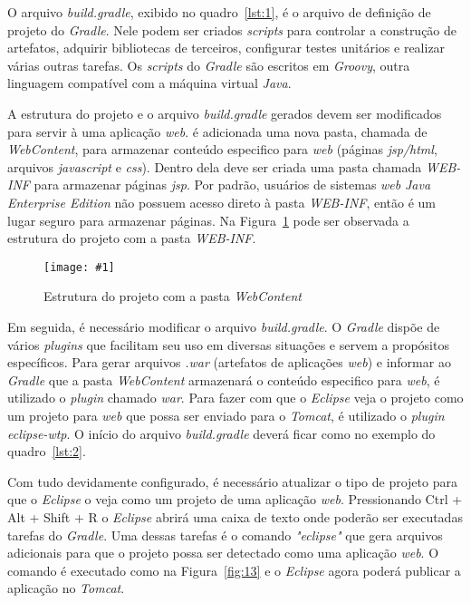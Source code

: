 \documentclass[a4paper,12pt]{article}
\newcommand{\figura}[3] {
	\begin{figure}[ht]
		\centering
		\texttt{[image: \#1]}
		\caption{#2}
		\label{#3}
	\end{figure}
	\FloatBarrier
}
\newcommand{\est}[1] {
\textit{#1}}
\newcommand{\arquivo}[1] {
\textit{#1}}
\newcommand{\lang}[1] {
\textit{#1}}
\newcommand{\groovycode}[3] {
	
}
\begin{document}
O arquivo \arquivo{build.gradle}, exibido no quadro~\ref{lst:1}, é o arquivo de definição de projeto do \est{Gradle}. Nele podem ser criados \est{scripts} para controlar a construção de artefatos, adquirir bibliotecas de terceiros, configurar testes unitários e realizar várias outras tarefas. Os \est{scripts} do \est{Gradle} são escritos em \lang{Groovy}, outra linguagem compatível com a máquina virtual \lang{Java}. 

\groovycode{code/buildgradle.txt}{O arquivo \est{build.gradle}}{lst:1}

A estrutura do projeto e o arquivo \arquivo{build.gradle} gerados devem ser modificados para servir à uma aplicação \est{web}. é adicionada uma nova pasta, chamada de \est{WebContent}, para armazenar conteúdo especifico para \est{web} (páginas \est{jsp/html}, arquivos \lang{javascript} e \lang{css}). Dentro dela deve ser criada uma pasta chamada \est{WEB-INF} para armazenar páginas \est{jsp}. Por padrão, usuários de sistemas \est{web} \est{Java Enterprise Edition} não possuem acesso direto à pasta \est{WEB-INF}, então é um lugar seguro para armazenar páginas. Na Figura~\ref{fig:12} pode ser observada a estrutura do projeto com a pasta \est{WEB-INF}.

\figura{prrojetocomweninf.png}{Estrutura do projeto com a pasta \est{WebContent}}{fig:12}

Em seguida, é necessário modificar o arquivo \arquivo{build.gradle}. O \est{Gradle} dispõe de vários \est{plugins} que facilitam seu uso em diversas situações e servem a propósitos específicos. Para gerar arquivos \arquivo{.war} (artefatos de aplicações \est{web}) e informar ao \est{Gradle} que a pasta \est{WebContent} armazenará o conteúdo especifico para \est{web}, é utilizado o \est{plugin} chamado \est{war}. Para fazer com que o \est{Eclipse} veja o projeto como um projeto para \est{web} que possa ser enviado para o \est{Tomcat}, é utilizado o \est{plugin} \est{eclipse-wtp}. O início do arquivo \arquivo{build.gradle} deverá ficar como no exemplo do quadro~\ref{lst:2}.

\groovycode{code/newgradle.txt}{Arquivo \arquivo{build.gradle} com novos \est{plugins}}{lst:2}

Com tudo devidamente configurado, é necessário atualizar o tipo de projeto para que o \est{Eclipse} o veja como um projeto de uma aplicação \est{web}. Pressionando Ctrl + Alt + Shift + R o \est{Eclipse} abrirá uma caixa de texto onde poderão ser executadas tarefas do \est{Gradle}. Uma dessas tarefas é o comando \est{"eclipse"} que gera arquivos adicionais para que o projeto possa ser detectado como uma aplicação \est{web}. O comando é executado como na Figura~\ref{fig:13} e o \est{Eclipse} agora poderá publicar a aplicação no \est{Tomcat}.
\end{document}
